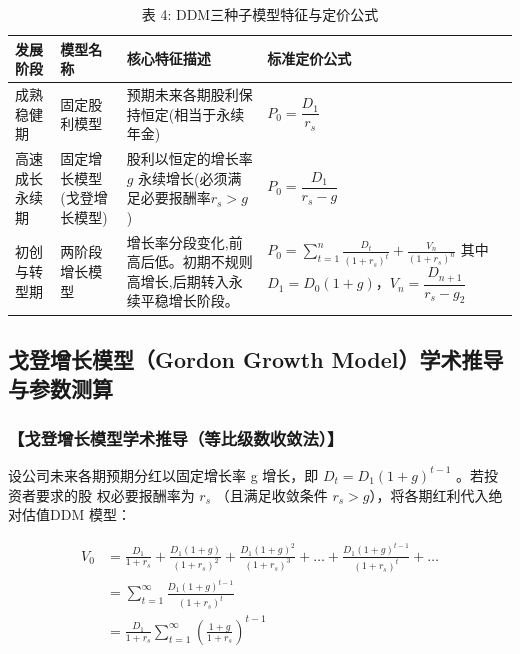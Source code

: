 \documentclass[lang=cn,10pt,color=blue]{elegantbook}
\begin{document}
\begin{table}[ht]
  \centering
  \caption{表 4: DDM三种子模型特征与定价公式}
  \renewcommand{\arraystretch}{1.5}
      \setlength{\extrarowheight}{3pt}
\begin{tabularx}{\textwidth}{llYY}
  \toprule
  发展阶段 & 模型名称 & 核心特征描述 & 标准定价公式 \\
  \midrule
  成熟稳健期 & 固定股利模型 & 预期未来各期股利保持恒定(相当于永续年金) & $P_0 = \dfrac{D_1}{r_s}$ \\
  高速成长永续期 & 固定增长模型(戈登增长模型) & 股利以恒定的增长率 $g$ 永续增长(必须满足必要报酬率$r_s > g$) & $P_0 = \dfrac{D_1}{r_s - g}$ \\
	初创与转型期 & 两阶段增长模型 & 增长率分段变化,前高后低。初期不规则高增长,后期转入永续平稳增长阶段。 & $\displaystyle P_0 = \sum_{t=1}^{n} \frac{D_t}{(1+r_s)^t} + \frac{V_n}{(1+r_s)^n}$\newline
	  其中 $D_1 = D_0(1+g)$，$V_n = \dfrac{D_{n+1}}{r_s - g_2}$ \\
      \bottomrule
\end{tabularx}
\end{table}

\subsection{戈登增长模型（Gordon Growth Model）学术推导与参数测算}

\subsubsection{【戈登增长模型学术推导（等比级数收敛法）】}

设公司未来各期预期分红以固定增长率 g 增长，即 $D _ { t } = D _ { 1 } ( 1 + g ) ^ { t - 1 }$ 。若投资者要求的股 权必要报酬率为 $r _ { s }$ （且满足收敛条件 $r_s > g$），将各期红利代入绝对估值DDM 模型： 

$$
\begin{aligned}
  V _ {0} &= \frac {D _ {1}}{1 + r _ {s}} + \frac {D _ {1} (1 + g)}{(1 + r _ {s}) ^ {2}} + \frac {D _ {1} (1 + g) ^ {2}}{(1 + r _ {s}) ^ {3}} + \dots + \frac {D _ {1} (1 + g) ^ {t - 1}}{(1 + r _ {s}) ^ {t}} + \dots \\[1.2ex]
  &= \sum_ {t = 1} ^ {\infty} \frac {D _ {1} (1 + g) ^ {t - 1}}{(1 + r _ {s}) ^ {t}} \\[1.2ex]
  &= \frac {D _ {1}}{1 + r _ {s}} \sum_ {t = 1} ^ {\infty} \left(\frac {1 + g}{1 + r _ {s}}\right) ^ {t - 1}
\end{aligned}
$$
\end{document}
